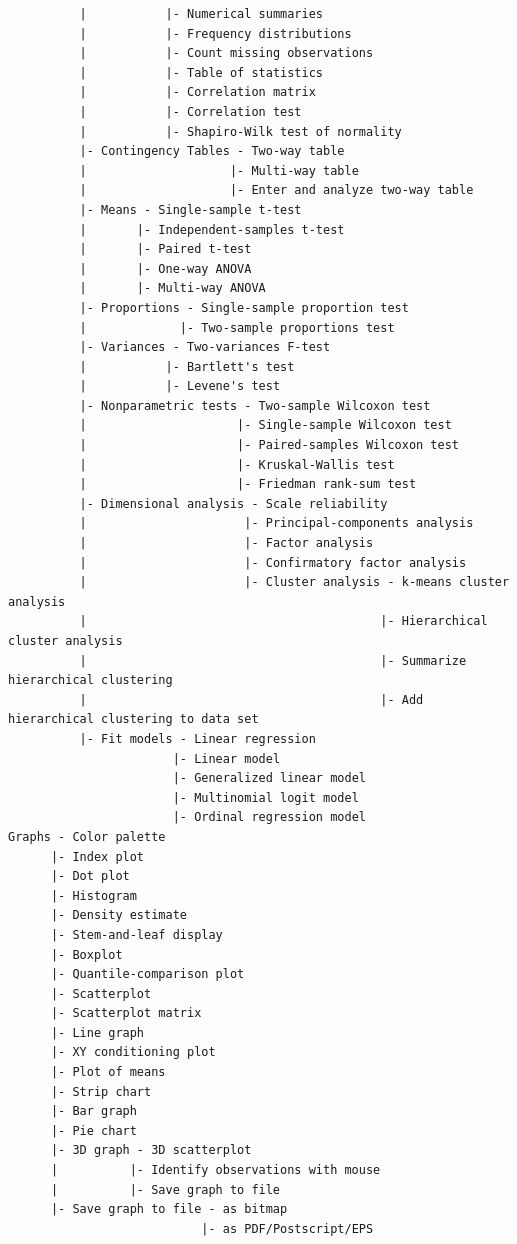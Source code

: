 \documentclass{article}%
\begin{document}
\begin{verbatim}
          |           |- Numerical summaries
          |           |- Frequency distributions
          |           |- Count missing observations
          |           |- Table of statistics
          |           |- Correlation matrix
          |           |- Correlation test
          |           |- Shapiro-Wilk test of normality
          |- Contingency Tables - Two-way table
          |                    |- Multi-way table
          |                    |- Enter and analyze two-way table
          |- Means - Single-sample t-test
          |       |- Independent-samples t-test
          |       |- Paired t-test
          |       |- One-way ANOVA
          |       |- Multi-way ANOVA
          |- Proportions - Single-sample proportion test
          |             |- Two-sample proportions test
          |- Variances - Two-variances F-test
          |           |- Bartlett's test
          |           |- Levene's test
          |- Nonparametric tests - Two-sample Wilcoxon test
          |                     |- Single-sample Wilcoxon test
          |                     |- Paired-samples Wilcoxon test
          |                     |- Kruskal-Wallis test
          |                     |- Friedman rank-sum test
          |- Dimensional analysis - Scale reliability
          |                      |- Principal-components analysis
          |                      |- Factor analysis
          |                      |- Confirmatory factor analysis
          |                      |- Cluster analysis - k-means cluster analysis
          |                                         |- Hierarchical cluster analysis
          |                                         |- Summarize hierarchical clustering
          |                                         |- Add hierarchical clustering to data set
          |- Fit models - Linear regression
                       |- Linear model
                       |- Generalized linear model
                       |- Multinomial logit model
                       |- Ordinal regression model
Graphs - Color palette
      |- Index plot
      |- Dot plot
      |- Histogram
      |- Density estimate
      |- Stem-and-leaf display
      |- Boxplot
      |- Quantile-comparison plot
      |- Scatterplot
      |- Scatterplot matrix
      |- Line graph
      |- XY conditioning plot
      |- Plot of means
      |- Strip chart
      |- Bar graph
      |- Pie chart
      |- 3D graph - 3D scatterplot
      |          |- Identify observations with mouse
      |          |- Save graph to file
      |- Save graph to file - as bitmap
                           |- as PDF/Postscript/EPS

\end{verbatim}
\end{document}
